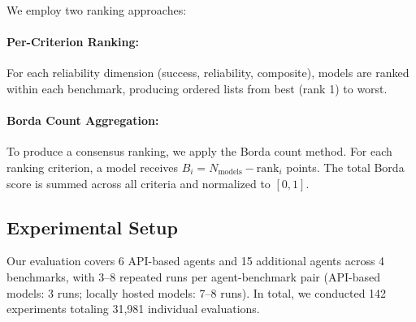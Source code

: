 We employ two ranking approaches:

\paragraph{Per-Criterion Ranking:} For each reliability dimension (success, reliability, composite), models are ranked within each benchmark, producing ordered lists from best (rank 1) to worst.

\paragraph{Borda Count Aggregation:} To produce a consensus ranking, we apply the Borda count method. For each ranking criterion, a model receives $B_i = N_{\text{models}} - \text{rank}_i$ points. The total Borda score is summed across all criteria and normalized to $[0, 1]$.

\subsection{Experimental Setup}

Our evaluation covers 6 API-based agents and 15 additional agents across 4 benchmarks, with 3--8 repeated runs per agent-benchmark pair (API-based models: 3 runs; locally hosted models: 7--8 runs). In total, we conducted 142 experiments totaling 31,981 individual evaluations.
